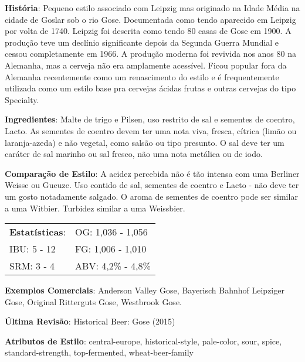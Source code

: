 \textbf{História}: Pequeno estilo associado com Leipzig mas originado na Idade Média na cidade de Goslar sob o rio Gose. Documentada como tendo aparecido em Leipzig por volta de 1740. Leipzig foi descrita como tendo 80 casas de Gose em 1900. A produção teve um declínio significante depois da Segunda Guerra Mundial e cessou completamente em 1966. A produção moderna foi revivida nos anos 80 na Alemanha, mas a cerveja não era amplamente acessível. Ficou popular fora da Alemanha recentemente como um renascimento do estilo e é frequentemente utilizada como um estilo base pra cervejas ácidas frutas e outras cervejas do tipo Specialty.

\textbf{Ingredientes}: Malte de trigo e Pilsen, uso restrito de sal e sementes de coentro, Lacto. As sementes de coentro devem ter uma nota viva, fresca, cítrica (limão ou laranja-azeda) e não vegetal, como salsão ou tipo presunto. O sal deve ter um caráter de sal marinho ou sal fresco, não uma nota metálica ou de iodo.

\textbf{Comparação de Estilo}: A acidez percebida não é tão intensa com uma Berliner Weisse ou Gueuze. Uso contido de sal, sementes de coentro e Lacto - não deve ter um gosto notadamente salgado. O aroma de sementes de coentro pode ser similar a uma Witbier. Turbidez similar a uma Weissbier.

\begin{tabular}{@{}p{35mm}p{35mm}@{}}
  \textbf{Estatísticas}: & OG: 1,036 - 1,056 \\
  IBU: 5 - 12  & FG: 1,006 - 1,010  \\
  SRM: 3 - 4  & ABV: 4,2\% - 4,8\%
\end{tabular}

\textbf{Exemplos Comerciais}: Anderson Valley Gose, Bayerisch Bahnhof Leipziger Gose, Original Ritterguts Gose, Westbrook Gose.

\textbf{Última Revisão}: Historical Beer: Gose (2015)

\textbf{Atributos de Estilo}: central-europe, historical-style, pale-color, sour, spice, standard-strength, top-fermented, wheat-beer-family
